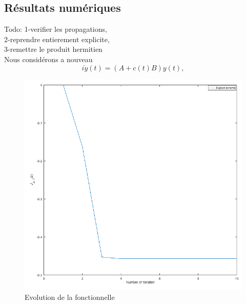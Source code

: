 \subsection{Résultats numériques}
Todo: 1-verifier les propagations, \\2-reprendre entierement explicite, \\3-remettre le produit hermitien\\
Nous considérons a nouveau 
\begin{equation}
i\dot y(t)= (A+c(t)B)y(t),
\end{equation}
\begin{figure}[H]
	\caption{Evolution de la fonctionnelle}
	\centering
	\includegraphics[scale=0.6]{images/explicit_func.png}
\end{figure}
